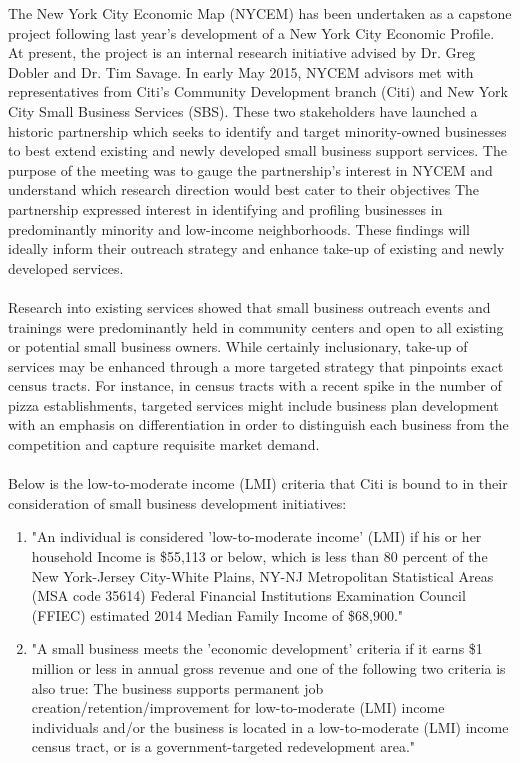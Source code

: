 \documentclass[article, 11pt]{article} %
\begin{document}
The New York City Economic Map (NYCEM) has been undertaken as a capstone project following last year's development of a New York City Economic Profile. At present, the project is an internal research initiative advised by Dr. Greg Dobler and Dr. Tim Savage. In early May 2015, NYCEM advisors met with representatives from Citi's Community Development branch (Citi) and New York City Small Business Services (SBS). These two stakeholders have launched a historic partnership which seeks to identify and target minority-owned businesses to best extend existing and newly developed small business support services. The purpose of the meeting was to gauge the partnership's interest in NYCEM and understand which research direction would best cater to their objectives The partnership expressed interest in identifying and profiling businesses in predominantly minority and low-income neighborhoods. These findings will ideally inform their outreach strategy and enhance take-up of existing and newly developed services. 
\\\\
Research into existing services showed that small business outreach events and trainings were predominantly held in community centers and open to all existing or potential small business owners. While certainly inclusionary, take-up of services may be enhanced through a more targeted strategy that pinpoints exact census tracts. For instance, in census tracts with a recent spike in the number of pizza establishments, targeted services might include business plan development with an emphasis on differentiation in order to distinguish each business from the competition and capture requisite market demand.
\\\\
Below is the low-to-moderate income (LMI) criteria that Citi is bound to in their consideration of small business development initiatives:
\begin{enumerate}
\item "An individual is considered 'low-to-moderate income' (LMI) if his or her household Income is \$55,113 or below, which is less than 80 percent of the New York-Jersey City-White Plains, NY-NJ Metropolitan Statistical Areas (MSA code 35614) Federal
Financial Institutions Examination Council (FFIEC) estimated 2014 Median Family Income of \$68,900."
\item "A small business meets the 'economic development' criteria if it earns \$1 million or less in annual gross revenue and one of the following two criteria is also true:
The business supports permanent job creation/retention/improvement for low-to-moderate (LMI) income individuals and/or the business is located in a low-to-moderate (LMI) income census tract, or is a government-targeted redevelopment area."
\end{enumerate}
\end{document}
